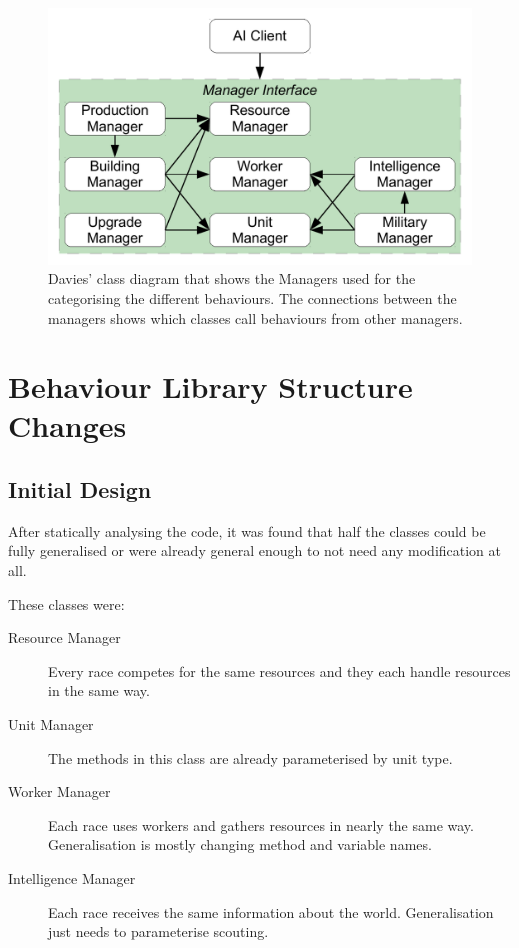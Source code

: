 \documentclass[11pt,openright,a4paper]{report}
\begin{document}
\begin{figure}[h]
    \centering
    \includegraphics[scale=0.5]{OrigClassDia}
    \caption{Davies' class diagram that shows the Managers used for the categorising the different behaviours. The connections between the managers shows which classes call behaviours from other managers.\protect\cite[Fig.~3.2]{davies2012}}
    \label{fig:SimonClassDia}
\end{figure}

\section{Behaviour Library Structure Changes}
\subsection{Initial Design}
After statically analysing the code, it was found that half the classes could be fully generalised or were already general enough to not need any modification at all.

These classes were:
\begin{description}
\item[Resource Manager]Every race competes for the same resources and they each handle resources in the same way.
\item[Unit Manager]The methods in this class are already parameterised by unit type.
\item[Worker Manager]Each race uses workers and gathers resources in nearly the same way. Generalisation is mostly changing method and variable names.
\item[Intelligence Manager]Each race receives the same information about the world. Generalisation just needs to parameterise scouting.
\end{description}
\end{document}
